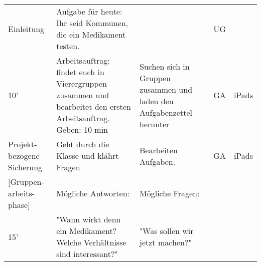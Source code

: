 \documentclass{article}
\begin{document}
\begin{tabularx}{\textwidth}{|X|X|X|X|X|}
Einleitung                    & Aufgabe für heute: Ihr seid Kommunen, die ein Medikament testen.                                                                                                                                                                  &                                                                                                                             & UG                                                                                       &                                                                             \\
10'                           & Arbeitsauftrag: findet euch in Vierergruppen zusammen und bearbeitet den ersten Arbeitsauftrag. Geben: 10 min                                                                                                                     & Suchen sich in Gruppen zusammen und laden den Aufgabenzettel herunter                                                       & GA                                                                                       & iPads                                                                       \\ \hline
Projekt- bezogene Sicherung     & Geht durch die Klasse und klährt Fragen                                                                                                                                                                                           & Bearbeiten Aufgaben.                                                                                                        & GA                                                                                       & iPads                                                                       \\
{[}Gruppen- arbeits- phase{]}     & Mögliche Antworten:                                                                                                                                                                                                               & Mögliche Fragen:                                                                                                            &                                                                                          &                                                                             \\
15'                           & "Wann wirkt denn ein Medikament? Welche Verhältnisse sind interessant?"                                                                                                                                                           & "Was sollen wir jetzt machen?"                                                                                              &                                                                                          &                                                                             \\

\end{tabularx}
\end{document}

